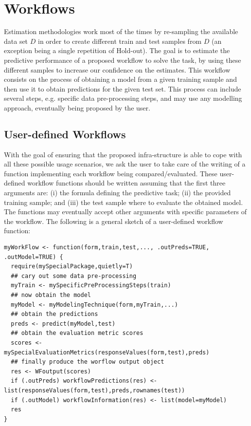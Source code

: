 \documentclass[10pt,a4paper]{article}\usepackage[]{graphicx}\usepackage[]{color}
\begin{document}
\section{Workflows}

Estimation methodologies work most of the times by re-sampling the
available data set $D$ in order to create different train and test
samples from $D$ (an exception being a single repetition of Hold-out). The goal is to estimate the predictive performance
of a proposed workflow to solve the task, by using these different
samples to increase our confidence on the estimates. This workflow
consists on the process of obtaining a model from a given training
sample and then use it to obtain predictions for the given test
set. This process can include several steps, e.g. specific data
pre-processing steps, and may use any modelling approach, eventually
being proposed by the user. 

\subsection{User-defined Workflows}

With the goal of ensuring that the
proposed infra-structure is able to cope with all these possible usage
scenarios, we ask the user to take care of the writing of a function
implementing each workflow being compared/evaluated. These
user-defined workflow functions should be written assuming that the
first three arguments are: (i) the formula defining the predictive
task; (ii) the provided training sample; and (iii) the test sample
where to evaluate the obtained model. The functions may eventually
accept other arguments with specific parameters of the workflow. The
following is a general sketch of a user-defined workflow function:

\begin{Verbatim}
myWorkFlow <- function(form,train,test,..., .outPreds=TRUE, .outModel=TRUE) {
  require(mySpecialPackage,quietly=T)
  ## cary out some data pre-processing
  myTrain <- mySpecificPreProcessingSteps(train)
  ## now obtain the model
  myModel <- myModelingTechnique(form,myTrain,...)
  ## obtain the predictions
  preds <- predict(myModel,test)
  ## obtain the evaluation metric scores
  scores <- mySpecialEvaluationMetrics(responseValues(form,test),preds)
  ## finally produce the worflow output object
  res <- WFoutput(scores)
  if (.outPreds) workflowPredictions(res) <- list(responseValues(form,test),preds,rownames(test))
  if (.outModel) workflowInformation(res) <- list(model=myModel) 
  res
}
\end{Verbatim}
\end{document}
